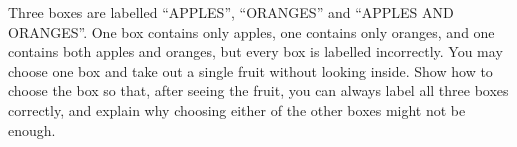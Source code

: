 Three boxes are labelled ``APPLES'', ``ORANGES'' and ``APPLES AND ORANGES''. One box contains only apples, one contains only oranges, and one contains both apples and oranges, but every box is labelled incorrectly. You may choose one box and take out a single fruit without looking inside. Show how to choose the box so that, after seeing the fruit, you can always label all three boxes correctly, and explain why choosing either of the other boxes might not be enough.
